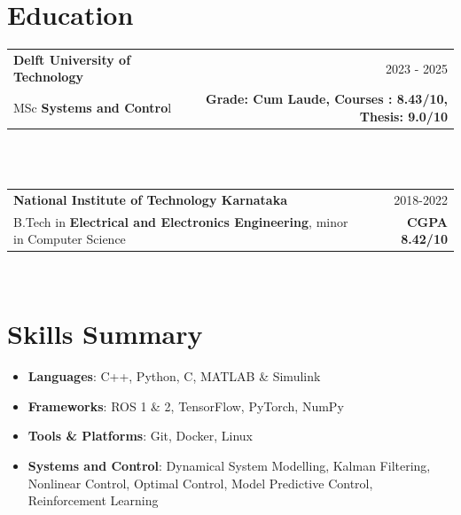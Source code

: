 \documentclass[a4paper,20pt]{article}
\makeatletter
\newcommand{\resumeItem}[2]{
  \item\small{
    \textbf{#1}{: #2 \vspace{-2pt}}
  }
}
\newcommand{\resumeSubheadingEd}[4]{
  \vspace{-1pt}\item
    \begin{tabular*}{0.97\textwidth}{l@{\extracolsep{\fill}}r}
      \textbf{#1} & #2 \\
      #3  & #4 \\
    \end{tabular*}\vspace{-5pt}
}
\newcommand{\resumeSubItem}[2]{\resumeItem{#1}{#2}\vspace{-3pt}}
\newcommand{\resumeSubHeadingListStart}{\begin{itemize}[leftmargin=*]}
\newcommand{\resumeSubHeadingListEnd}{\end{itemize}}
\makeatother
\begin{document}
\section{Education}
   
    \resumeSubheadingEd
      {Delft University of Technology }{2023 - 2025}
       {MSc \textbf{Systems and Contro}l }{ \textbf{Grade: Cum Laude, Courses : 8.43/10, Thesis: 9.0/10}  } \\
       
        \\
        \vspace{5pt}
    \resumeSubheadingEd
      {National Institute of Technology Karnataka  }{2018-2022}
       {B.Tech in \textbf{Electrical and Electronics Engineering}, minor in Computer Science }  {\textbf{CGPA 8.42/10}}
        \\
        \vspace{5pt}
    \vspace{5pt}

\section{Skills Summary}
\resumeSubHeadingListStart
  \resumeSubItem{Languages}{C++, Python, C, MATLAB & Simulink}
  \resumeSubItem{Frameworks}{ROS 1 \& 2, TensorFlow, PyTorch, NumPy}
  \resumeSubItem{Tools \& Platforms}{Git, Docker, Linux}
  \resumeSubItem{Systems and Control}{Dynamical System Modelling, Kalman Filtering, Nonlinear Control, Optimal Control, Model Predictive Control, Reinforcement Learning}
    
\resumeSubHeadingListEnd
    \vspace{-5pt}

   
       
\end{document}

